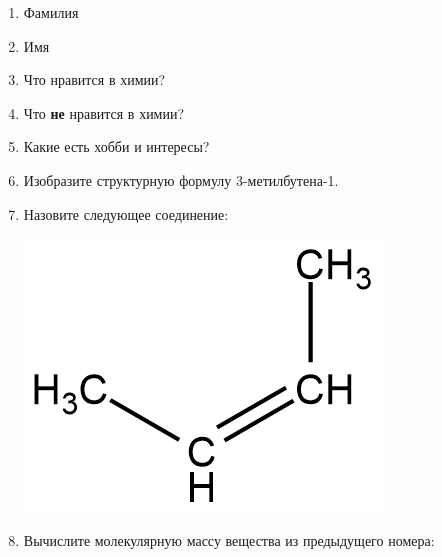 \documentclass[12pt, a4paper, oneside]{article}	%
\begin{document}
\begin{enumerate}[1.] %
	\item
		Фамилия

		\hrulefill

	\item
		Имя

		\hrulefill

	\item
		Что нравится в химии?

		\hrulefill

		\hrulefill

	\item
		Что \textbf{не} нравится в химии?

		\hrulefill

		\hrulefill

	\item
		Какие есть хобби и интересы?

		\hrulefill

		\hrulefill

	\item
		Изобразите структурную формулу 3-метилбутена-1.

		\vspace{5cm}

	\item
		Назовите следующее соединение:

		\includegraphics[scale=0.5]{10_13.01.21.png}

		\hrulefill

		\hrulefill

	\item
		Вычислите молекулярную массу вещества из предыдущего номера:

		\hrulefill

		\hrulefill

\end{enumerate}
\end{document}
